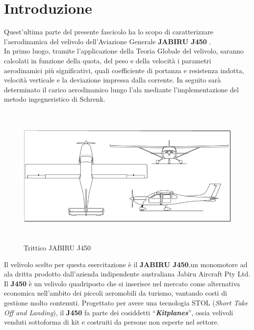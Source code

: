 \chapter{Introduzione}

Quest’ultima parte del presente fascicolo ha lo scopo di caratterizzare l’aerodinamica del velivolo dell’Aviazione Generale {\bfseries JABIRU J450} \cite{prof:jabiru}.\\
In primo luogo, tramite l’applicazione della Teoria Globale del velivolo, saranno calcolati in funzione della quota, del peso e della velocità i parametri aerodinamici più significativi, quali coefficiente di portanza e resistenza indotta, velocità verticale e la deviazione impressa dalla corrente.
In seguito sarà determinato il carico aerodinamico lungo l’ala mediante l’implementazione del metodo ingegneristico di Schrenk. \\

\begin {figure} [h!]
\centering
\includegraphics[height= 7cm ]{immagini/trittico.png}
\caption{\footnotesize Trittico JABIRU J450}
\label {fig:trittico}
\end {figure}
\noindent 

Il velivolo scelto per questa esercitazione è il {\bfseries JABIRU J450},un monomotore ad ala dritta prodotto dall’azienda indipendente australiana Jabiru Aircraft Pty Ltd. Il {\bfseries J450} è un velivolo quadriposto che si inserisce nel mercato come alternativa economica nell’ambito dei piccoli aeromobili da turismo, vantando costi di gestione molto contenuti.
Progettato per avere una tecnologia STOL ({\itshape Short Take Off and Landing}), il {\bfseries J450} fa parte dei cosiddetti “{\bfseries \itshape Kitplanes}”, ossia velivoli venduti sottoforma di kit e costruiti da persone non esperte nel settore.\\

